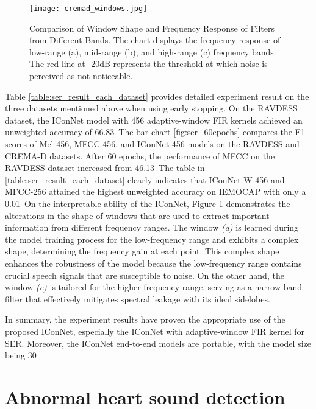 {\begin{figure}[t]
\texttt{[image: cremad\_windows.jpg]}
\caption{Comparison of Window Shape and Frequency Response of Filters from Different Bands. The chart displays the frequency response of low-range (a), mid-range (b), and high-range (c) frequency bands. The red line at -20dB represents the threshold at which noise is perceived as not noticeable.}
\label{fig:ser_windows}
\end{figure}

Table \ref{table:ser_result_each_dataset} provides detailed experiment result on the three datasets mentioned above when using early stopping. On the RAVDESS dataset, the IConNet model with 456 adaptive-window FIR kernels achieved an unweighted accuracy of 66.83\
The bar chart \ref{fig:ser_60epochs} compares the F1 scores of Mel-456, MFCC-456, and IConNet-456 models on the RAVDESS and CREMA-D datasets. After 60 epochs, the performance of MFCC on the RAVDESS dataset increased from 46.13\
The table in \ref{table:ser_result_each_dataset} clearly indicates that IConNet-W-456 and MFCC-256 attained the highest unweighted accuracy on IEMOCAP with only a 0.01\
On the interpretable ability of the IConNet, Figure \ref{fig:ser_windows} demonstrates the alterations in the shape of windows that are used to extract important information from different frequency ranges. The window \textit{(a)} is learned during the model training process for the low-frequency range and exhibits a complex shape, determining the frequency gain at each point. This complex shape enhances the robustness of the model because the low-frequency range contains crucial speech signals that are susceptible to noise. On the other hand, the window \textit{(c)} is tailored for the higher frequency range, serving as a narrow-band filter that effectively mitigates spectral leakage with its ideal sidelobes.

In summary, the experiment results have proven the appropriate use of the proposed IConNet, especially the IConNet with adaptive-window FIR kernel for SER. Moreover, the IConNet end-to-end models are portable, with the model size being 30\


\section{Abnormal heart sound detection} 
\label{sec:heart}
}
